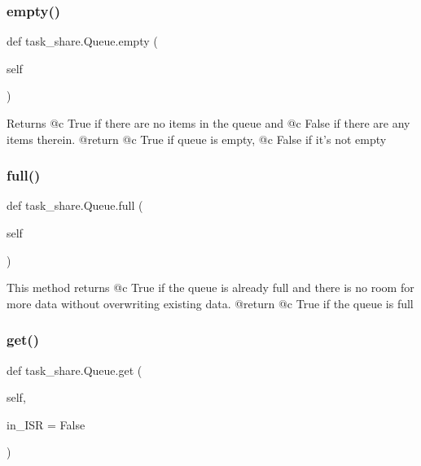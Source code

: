 \subsubsection{\texorpdfstring{empty()}{empty()}}
{\footnotesize\ttfamily def task\+\_\+share.\+Queue.\+empty (\begin{DoxyParamCaption}\item[{}]{self }\end{DoxyParamCaption})}

\begin{DoxyVerb}Returns @c True if there are no items in the queue and @c False if 
there are any items therein.
@return @c True if queue is empty, @c False if it's not empty \end{DoxyVerb}
 \mbox{\label{classtask__share_1_1Queue_a0482d70ce6405fd8d85628b5cf95d471}} 
\subsubsection{\texorpdfstring{full()}{full()}}
{\footnotesize\ttfamily def task\+\_\+share.\+Queue.\+full (\begin{DoxyParamCaption}\item[{}]{self }\end{DoxyParamCaption})}

\begin{DoxyVerb}This method returns @c True if the queue is already full and there
is no room for more data without overwriting existing data. 
@return @c True if the queue is full \end{DoxyVerb}
 \mbox{\label{classtask__share_1_1Queue_af2aef1dd3eed21c4b6c2e601cb8497d4}} 
\subsubsection{\texorpdfstring{get()}{get()}}
{\footnotesize\ttfamily def task\+\_\+share.\+Queue.\+get (\begin{DoxyParamCaption}\item[{}]{self,  }\item[{}]{in\+\_\+\+I\+SR = {\ttfamily False} }\end{DoxyParamCaption})}

